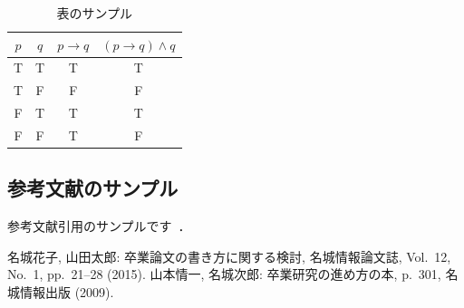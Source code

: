 \documentclass[a4paper]{jarticle}
\begin{document}
\begin{論文概要}
\begin{table}[ht]
\centering
\caption{表のサンプル}
\label{tbl:sample1}
\begin{tabular}{|c|c||c|c|} \hline
$p$ & $q$ & $p\rightarrow q$ & $(p\rightarrow q)\wedge q$ \\ \hline
T & T & T & T \\ \hline
T & F & F & F \\ \hline
F & T & T & T \\ \hline
F & F & T & F \\ \hline
\end{tabular}
\end{table}

\subsection{参考文献のサンプル}
参考文献引用のサンプルです~\cite{paper1}\cite{paper2}．


\begin{thebibliography}{9}
名城花子, 山田太郎: 卒業論文の書き方に関する検討, 名城情報論文誌,
  Vol.~12, No.~1, pp.~21--28 (2015).
山本情一, 名城次郎: 卒業研究の進め方の本, p.~301, 名城情報出版 (2009).
\end{thebibliography}

\end{論文概要} %
\end{document}
